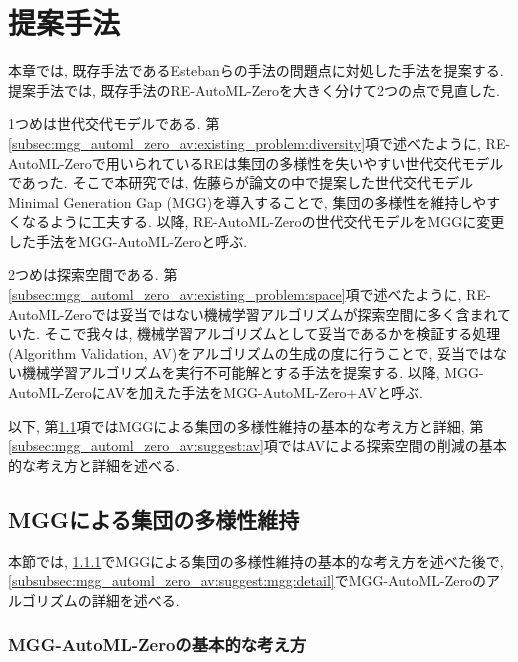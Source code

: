 \documentclass[11pt,oneside,openany,report]{jsbook}
\begin{document}
\section{提案手法}\label{sec:mgg_automl_zero_av:suggest}

本章では, 既存手法であるEstebanらの手法の問題点に対処した手法を提案する. 提案手法では, 既存手法のRE-AutoML-Zeroを大きく分けて2つの点で見直した.

1つめは世代交代モデルである. 第\ref{subsec:mgg_automl_zero_av:existing_problem:diversity}項で述べたように, RE-AutoML-Zeroで用いられているREは集団の多様性を失いやすい世代交代モデルであった. そこで本研究では, 佐藤らが論文\cite{mgg}の中で提案した世代交代モデルMinimal Generation Gap (MGG)を導入することで, 集団の多様性を維持しやすくなるように工夫する. 以降, RE-AutoML-Zeroの世代交代モデルをMGGに変更した手法をMGG-AutoML-Zeroと呼ぶ.

2つめは探索空間である. 第\ref{subsec:mgg_automl_zero_av:existing_problem:space}項で述べたように, RE-AutoML-Zeroでは妥当ではない機械学習アルゴリズムが探索空間に多く含まれていた. そこで我々は, 機械学習アルゴリズムとして妥当であるかを検証する処理(Algorithm Validation, AV)をアルゴリズムの生成の度に行うことで, 妥当ではない機械学習アルゴリズムを実行不可能解とする手法を提案する. 以降, MGG-AutoML-ZeroにAVを加えた手法をMGG-AutoML-Zero+AVと呼ぶ.

以下, 第\ref{subsec:mgg_automl_zero_av:suggest:mgg}項ではMGGによる集団の多様性維持の基本的な考え方と詳細, 第\ref{subsec:mgg_automl_zero_av:suggest:av}項ではAVによる探索空間の削減の基本的な考え方と詳細を述べる.

\subsection{MGGによる集団の多様性維持}\label{subsec:mgg_automl_zero_av:suggest:mgg}

本節では, \ref{subsubsec:mgg_automl_zero_av:suggest:mgg:basic}でMGGによる集団の多様性維持の基本的な考え方を述べた後で, \ref{subsubsec:mgg_automl_zero_av:suggest:mgg:detail}でMGG-AutoML-Zeroのアルゴリズムの詳細を述べる.

\subsubsection{MGG-AutoML-Zeroの基本的な考え方}\label{subsubsec:mgg_automl_zero_av:suggest:mgg:basic}
\end{document}
